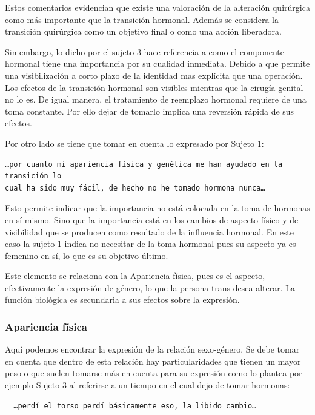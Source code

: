 Estos comentarios evidencian que existe una valoración de la alteración
quirúrgica como más importante que la transición hormonal. Además se considera
la transición quirúrgica como un objetivo final o como una acción liberadora.

Sin embargo, lo dicho por el sujeto 3 hace referencia a como el componente
hormonal tiene una importancia por su cualidad inmediata. Debido a que permite
una visibilización a corto plazo de la identidad mas explícita que una
operación. Los efectos de la transición hormonal son visibles mientras que la
cirugía genital no lo es. De igual manera, el tratamiento de reemplazo hormonal
requiere de una toma constante. Por ello dejar de tomarlo implica una reversión
rápida de sus efectos.

Por otro lado se tiene que tomar en cuenta lo expresado por Sujeto 1:

\begin{verbatim}
…por cuanto mi apariencia física y genética me han ayudado en la transición lo
cual ha sido muy fácil, de hecho no he tomado hormona nunca…
\end{verbatim}

Esto permite indicar que la importancia no está colocada en la toma de hormonas
en sí mismo. Sino que la importancia está en los cambios de aspecto físico y de
visibilidad que se producen como resultado de la influencia hormonal. En este
caso la sujeto 1 indica no necesitar de la toma hormonal pues su aspecto ya es
femenino en sí, lo que es su objetivo último.

Este elemento se relaciona con la Apariencia física, pues es el aspecto,
efectivamente la expresión de género, lo que la persona trans desea alterar. La
función biológica es secundaria a sus efectos sobre la expresión.

\subsubsection{Apariencia física}

Aquí podemos encontrar la expresión de la relación sexo-género. Se debe tomar en
cuenta que dentro de esta relación hay particularidades que tienen un mayor peso
o que suelen tomarse más en cuenta para su expresión como lo plantea por ejemplo
Sujeto 3 al referirse a un tiempo en el cual dejo de tomar hormonas:

\begin{verbatim}
  …perdí el torso perdí básicamente eso, la libido cambio…
\end{verbatim}

